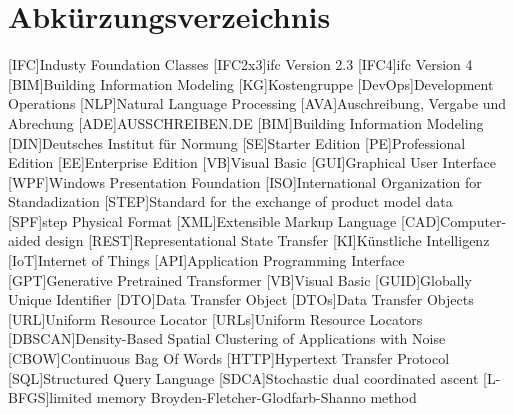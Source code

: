 \chapter{Abkürzungsverzeichnis}
\begin{acronym}
[IFC]{Industy Foundation Classes}
[IFC2x3]{\ac{ifc} Version 2.3}
[IFC4]{\ac{ifc} Version 4}
[BIM]{Building Information Modeling}
[KG]{Kostengruppe}
[DevOps]{Development Operations}
[NLP]{Natural Language Processing}
[AVA]{Auschreibung, Vergabe und Abrechung}
[ADE]{AUSSCHREIBEN.DE}
[BIM]{Building Information Modeling}
[DIN]{Deutsches Institut für Normung}
[SE]{Starter Edition}
[PE]{Professional Edition}
[EE]{Enterprise Edition}
[VB]{Visual Basic}
[GUI]{Graphical User Interface}
[WPF]{Windows Presentation Foundation}
[ISO]{International Organization for Standadization}
[STEP]{Standard for the exchange of product model data}
[SPF]{\ac{step} Physical Format}
[XML]{Extensible Markup Language}
[CAD]{Computer-aided design}
[REST]{Representational State Transfer}
[KI]{Künstliche Intelligenz}
[IoT]{Internet of Things}
[API]{Application Programming Interface}
[GPT]{Generative Pretrained Transformer}
[VB]{Visual Basic}
[GUID]{Globally Unique Identifier}
[DTO]{Data Transfer Object}
[DTOs]{Data Transfer Objects}
[URL]{Uniform Resource Locator}
[URLs]{Uniform Resource Locators}
[DBSCAN]{Density-Based Spatial Clustering of Applications with Noise}
[CBOW]{Continuous Bag Of Words}
[HTTP]{Hypertext Transfer Protocol}
[SQL]{Structured Query Language}
[SDCA]{Stochastic dual coordinated ascent}
[L-BFGS]{limited memory Broyden-Fletcher-Glodfarb-Shanno method}
\end{acronym}